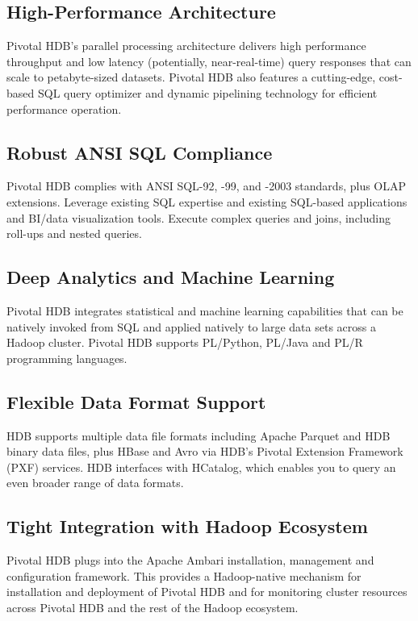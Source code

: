 \documentclass[9pt,twocolumn,twoside]{../../styles/osajnl}
\begin{document}
\subsection{High-Performance Architecture}

Pivotal HDB’s parallel processing architecture delivers high 
performance throughput and low latency (potentially, near-real-time) 
query responses that can scale to petabyte-sized datasets. Pivotal 
HDB also features a cutting-edge, cost-based SQL query optimizer and 
dynamic pipelining technology for efficient performance operation.

\subsection{Robust ANSI SQL Compliance}

Pivotal HDB complies with ANSI SQL-92, -99, and -2003 standards, plus 
{OLAP}\cite{www-olap} extensions. Leverage existing SQL expertise and 
existing 
SQL-based applications and BI/data visualization tools. Execute 
complex queries and joins, including roll-ups and nested queries.

\subsection{Deep Analytics and Machine Learning}

Pivotal HDB integrates statistical and machine learning capabilities 
that can be natively invoked from SQL and applied natively to large 
data sets across a Hadoop cluster. Pivotal HDB supports PL/Python, 
PL/Java and PL/R programming languages.

\subsection{Flexible Data Format Support}

HDB supports multiple data file formats including Apache Parquet and 
HDB binary data files, plus HBase and Avro via HDB’s Pivotal 
Extension Framework (PXF) services. HDB interfaces with HCatalog, 
which enables you to query an even broader range of data formats.

\subsection{Tight Integration with Hadoop Ecosystem}

Pivotal HDB plugs into the {Apache Ambari}\cite{www-apache-ambari} 
installation, management and 
configuration framework. This provides a Hadoop-native mechanism for 
installation and deployment of Pivotal HDB and for monitoring cluster 
resources across Pivotal HDB and the rest of the Hadoop ecosystem.
\end{document}
